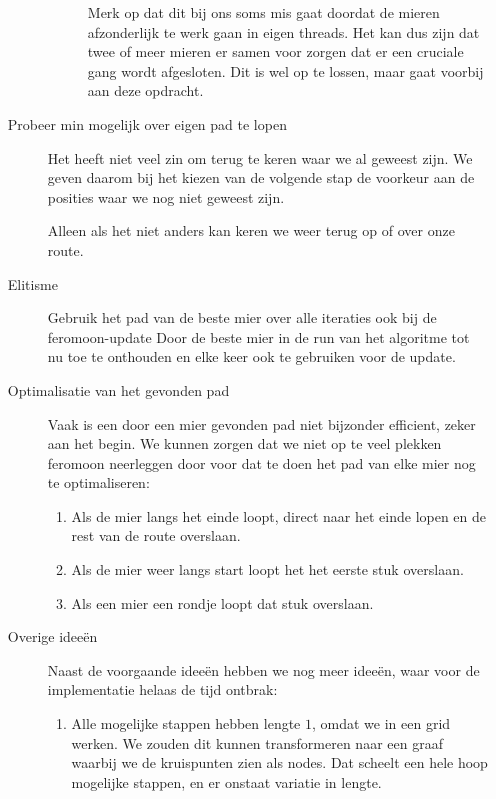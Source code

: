 \documentclass[a4paper,10pt,fleqn]{article}
\begin{document}
\begin{enumerate}[1.]
\begin{description}
\begin{description}
                  Merk op dat dit bij ons soms mis gaat doordat de mieren afzonderlijk te werk gaan in eigen threads. Het kan dus zijn dat twee of meer mieren er samen voor zorgen dat er een cruciale gang wordt afgesloten. Dit is wel op te lossen, maar gaat voorbij aan deze opdracht.
                \end{description}

        \item[Probeer min mogelijk over eigen pad te lopen]
        Het heeft niet veel zin om terug te keren waar we al geweest zijn. We geven daarom bij het kiezen van de volgende stap de voorkeur aan de posities waar we nog niet geweest zijn.

        Alleen als het niet anders kan keren we weer terug op of over onze route.

        \item[Elitisme] Gebruik het pad van de beste mier over alle iteraties ook bij de feromoon-update
        Door de beste mier in de run van het algoritme tot nu toe te onthouden en elke keer ook te gebruiken voor de update.


        \item[Optimalisatie van het gevonden pad]
        Vaak is een door een mier gevonden pad niet bijzonder efficient, zeker aan het begin. We kunnen zorgen dat we niet op te veel plekken feromoon neerleggen door voor dat te doen het pad van elke mier nog te optimaliseren:
            \begin{enumerate}[-]
                \item Als de mier langs het einde loopt, direct naar het einde lopen en de rest van de route overslaan.
                \item Als de mier weer langs start loopt het het eerste stuk overslaan.
                \item Als een mier een rondje loopt dat stuk overslaan.
            \end{enumerate}

        \item[Overige ideeën]
        Naast de voorgaande ideeën hebben we nog meer ideeën, waar voor de implementatie helaas de tijd ontbrak:
          \begin{enumerate}[-]
              \item Alle mogelijke stappen hebben lengte $1$, omdat we in een grid werken. We zouden dit kunnen transformeren naar een graaf waarbij we de kruispunten zien als nodes. Dat scheelt een hele hoop mogelijke stappen, en er onstaat variatie in lengte.
          \end{enumerate}


\end{description}
\end{enumerate}
\end{document}
